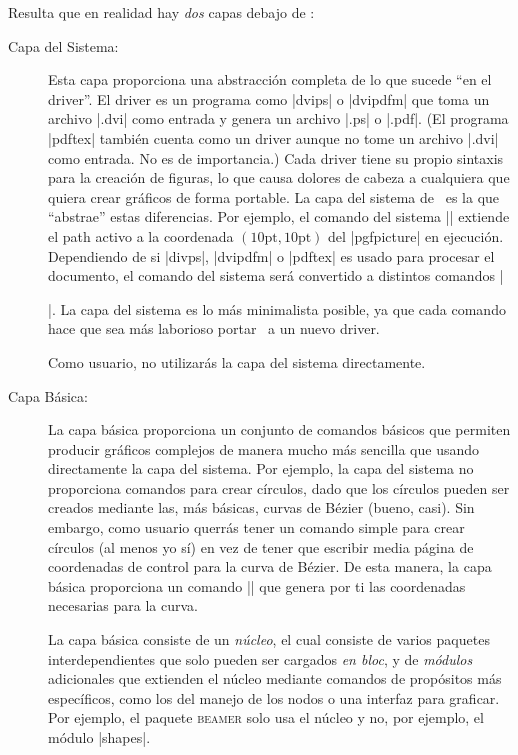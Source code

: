 Resulta que en realidad hay \emph{dos} capas debajo de \tikzname:
%
\begin{description}
    \item[Capa del Sistema:] Esta capa proporciona una abstracción completa de
    lo que sucede ``en el driver''. El driver es un programa como |dvips| o
    |dvipdfm| que toma un archivo |.dvi| como entrada y genera un archivo |.ps|
    o |.pdf|. (El programa |pdftex| también cuenta como un driver aunque no
    tome un archivo |.dvi| como entrada. No es de importancia.) Cada driver
    tiene su propio sintaxis para la creación de figuras, lo que causa dolores
    de cabeza a cualquiera que quiera crear gráficos de forma portable. La capa
    del sistema de \pgfname\ es la que ``abstrae'' estas diferencias. Por
    ejemplo, el comando del sistema |\pgfsys@lineto{10pt}{10pt}| extiende el
    path activo a la coordenada $(10\mathrm{pt},10\mathrm{pt})$ del
    |{pgfpicture}| en ejecución. Dependiendo de si |divps|, |dvipdfm| o |pdftex|
    es usado para procesar el documento, el comando del sistema será convertido
    a distintos comandos |\special|. La capa del sistema es lo más minimalista
    posible, ya que cada comando hace que sea más laborioso portar \pgfname\ a
    un nuevo driver.

    Como usuario, no utilizarás la capa del sistema directamente.

    \item[Capa Básica:] La capa básica proporciona un conjunto de comandos
    básicos que permiten producir gráficos complejos de manera mucho más
    sencilla que usando directamente la capa del sistema. Por ejemplo, la capa
    del sistema no proporciona comandos para crear círculos, dado que los
    círculos pueden ser creados mediante las, más básicas, curvas de Bézier
    (bueno, casi). Sin embargo, como usuario querrás tener un comando simple 
    para crear círculos (al menos yo sí) en vez de tener que escribir media
    página de coordenadas de control para la curva de Bézier. De esta manera, la
    capa básica proporciona un comando |\pgfpathcircle| que genera por ti las
    coordenadas necesarias para la curva. 

    La capa básica consiste de un \emph{núcleo}, el cual consiste de varios
    paquetes interdependientes que solo pueden ser cargados \emph{en bloc}, y de
    \emph{módulos} adicionales que extienden el núcleo mediante comandos de
    propósitos más específicos, como los del manejo de los nodos o una interfaz
    para graficar. Por ejemplo, el paquete \textsc{beamer} solo usa el núcleo y
    no, por ejemplo, el módulo |shapes|.

\end{description}

